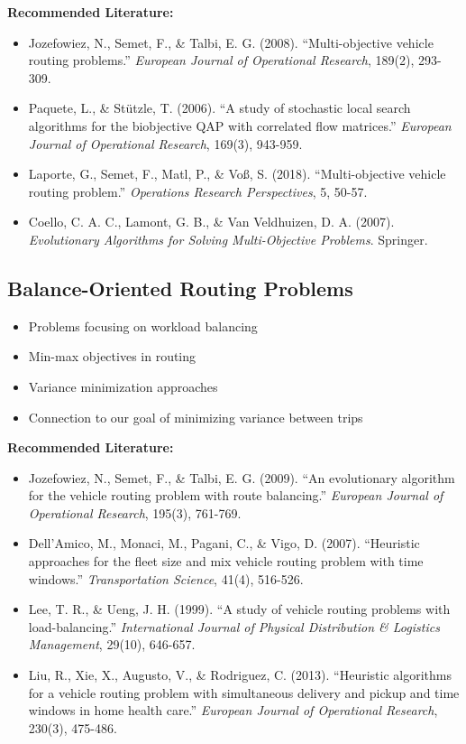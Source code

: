 \noindent\textbf{Recommended Literature:}
\begin{itemize}
    \item Jozefowiez, N., Semet, F., \& Talbi, E. G. (2008). ``Multi-objective vehicle routing problems.'' \textit{European Journal of Operational Research}, 189(2), 293-309.
    \item Paquete, L., \& Stützle, T. (2006). ``A study of stochastic local search algorithms for the biobjective QAP with correlated flow matrices.'' \textit{European Journal of Operational Research}, 169(3), 943-959.
    \item Laporte, G., Semet, F., Matl, P., \& Voß, S. (2018). ``Multi-objective vehicle routing problem.'' \textit{Operations Research Perspectives}, 5, 50-57.
    \item Coello, C. A. C., Lamont, G. B., \& Van Veldhuizen, D. A. (2007). \textit{Evolutionary Algorithms for Solving Multi-Objective Problems}. Springer.
\end{itemize}

\subsection{Balance-Oriented Routing Problems}
\begin{itemize}
    \item Problems focusing on workload balancing
    \item Min-max objectives in routing
    \item Variance minimization approaches
    \item Connection to our goal of minimizing variance between trips
\end{itemize}

\noindent\textbf{Recommended Literature:}
\begin{itemize}
    \item Jozefowiez, N., Semet, F., \& Talbi, E. G. (2009). ``An evolutionary algorithm for the vehicle routing problem with route balancing.'' \textit{European Journal of Operational Research}, 195(3), 761-769.
    \item Dell'Amico, M., Monaci, M., Pagani, C., \& Vigo, D. (2007). ``Heuristic approaches for the fleet size and mix vehicle routing problem with time windows.'' \textit{Transportation Science}, 41(4), 516-526.
    \item Lee, T. R., \& Ueng, J. H. (1999). ``A study of vehicle routing problems with load-balancing.'' \textit{International Journal of Physical Distribution \& Logistics Management}, 29(10), 646-657.
    \item Liu, R., Xie, X., Augusto, V., \& Rodriguez, C. (2013). ``Heuristic algorithms for a vehicle routing problem with simultaneous delivery and pickup and time windows in home health care.'' \textit{European Journal of Operational Research}, 230(3), 475-486.
\end{itemize}

